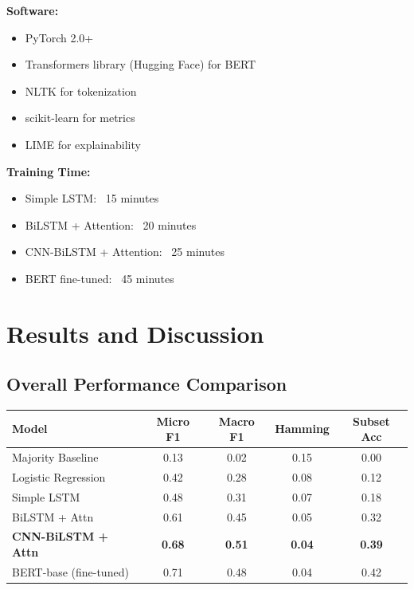 \documentclass[12pt,a4paper]{article}
\begin{document}
\textbf{Software:}
\begin{itemize}
    \item PyTorch 2.0+
    \item Transformers library (Hugging Face) for BERT
    \item NLTK for tokenization
    \item scikit-learn for metrics
    \item LIME for explainability
\end{itemize}

\textbf{Training Time:}
\begin{itemize}
    \item Simple LSTM: ~15 minutes
    \item BiLSTM + Attention: ~20 minutes
    \item CNN-BiLSTM + Attention: ~25 minutes
    \item BERT fine-tuned: ~45 minutes
\end{itemize}

\section{Results and Discussion}

\subsection{Overall Performance Comparison}

\begin{tablebox}
\centering
\caption{Performance Comparison on GoEmotions Test Set}
\label{tab:main_results}
\begin{tabular}{lcccc}
\toprule
\textbf{Model} & \textbf{Micro F1} & \textbf{Macro F1} & \textbf{Hamming} & \textbf{Subset Acc} \\
\midrule
Majority Baseline & 0.13 & 0.02 & 0.15 & 0.00 \\
Logistic Regression & 0.42 & 0.28 & 0.08 & 0.12 \\
\midrule
Simple LSTM & 0.48 & 0.31 & 0.07 & 0.18 \\
BiLSTM + Attn & 0.61 & 0.45 & 0.05 & 0.32 \\
\midrule
\textbf{CNN-BiLSTM + Attn} & \textbf{0.68} & \textbf{0.51} & \textbf{0.04} & \textbf{0.39} \\
\midrule
BERT-base (fine-tuned) & 0.71 & 0.48 & 0.04 & 0.42 \\
\bottomrule
\end{tabular}
\end{tablebox}
\end{document}
